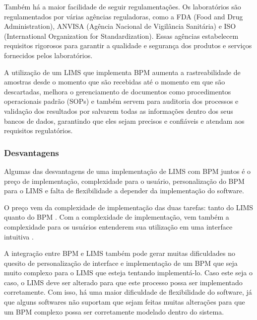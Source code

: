 Também há a maior facilidade de seguir regulamentações. Os laboratórios são regulamentados por várias agências reguladoras, como a FDA (Food and Drug Administration), ANVISA (Agência Nacional de Vigilância Sanitária) e ISO (International Organization for Standardization). Essas agências estabelecem requisitos rigorosos para garantir a qualidade e segurança dos produtos e serviços fornecidos pelos laboratórios.

A utilização de um LIMS que implementa BPM aumenta a rastreabilidade de amostras desde o momento que são recebidas até o momento em que são descartadas, melhora o gerenciamento de documentos como procedimentos operacionais padrão (SOPs) e também servem para auditoria dos processos e validação dos resultados por salvarem todas as informações dentro dos seus bancos de dados, garantindo que eles sejam precisos e confiáveis e atendam aos requisitos regulatórios.


\subsubsection{Desvantagens}

Algumas das desvantagens de uma implementação de LIMS com BPM juntos é o preço de implementação, complexidade para o usuário, personalização do BPM para o LIMS e falta de flexibilidade a depender da implementação do software.

O preço vem da complexidade de implementação das duas tarefas: tanto do LIMS quanto do BPM \R. Com a complexidade de implementação, vem também a complexidade para os usuários entenderem sua utilização em uma interface intuitiva \R.

A integração entre BPM e LIMS também pode gerar muitas dificuldades no quesito de personalização de interface e implementação de um BPM que seja muito complexo para o LIMS que esteja tentando implementá-lo. Caso este seja o caso, o LIMS deve ser alterado para que este processo possa ser implementado corretamente. Com isso, há uma maior dificuldade de flexibilidade do software, já que alguns softwares não suportam que sejam feitas muitas alterações para que um BPM complexo possa ser corretamente modelado dentro do sistema.
